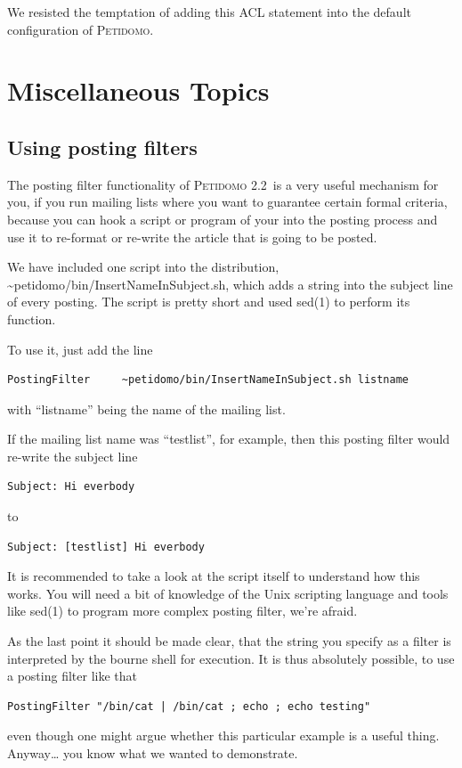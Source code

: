 \documentclass[a4paper,10pt]{scrreprt}
\newcommand{\Petidomo}{{\scshape Peti\-domo}}
\newcommand{\PetidomoTwo}{{\scshape Peti\-domo 2.2}}
\newcommand{\file}[1]{{\sf #1}}
\begin{document}
We resisted the temptation of adding this ACL statement into the
default configuration of \Petidomo.

%
\chapter{Miscellaneous Topics}
\section{Using posting filters}
\label{using posting filters}

The posting filter functionality of \PetidomoTwo\ is a very useful
mechanism for you, if you run mailing lists where you want to
guarantee certain formal criteria, because you can hook a script or
program of your into the posting process and use it to re-format or
re-write the article that is going to be posted.

We have included one
script into the distribution,
\file{\~{}peti\-domo/bin/Insert\-Name\-In\-Sub\-ject.sh}, which adds a string
into the subject line of every posting. The script is pretty short and
used sed(1) to perform its function.

To use it, just add the line
\begin{verbatim}
PostingFilter     ~petidomo/bin/InsertNameInSubject.sh listname
\end{verbatim}
with ``listname'' being the name of the mailing list.

If the mailing list name was ``testlist'', for example, then this
posting filter would re-write the subject line
\begin{verbatim}
Subject: Hi everbody
\end{verbatim}
to
\begin{verbatim}
Subject: [testlist] Hi everbody
\end{verbatim}

It is recommended to take a look at the script itself to understand
how this works. You will need a bit of knowledge of the Unix scripting
language and tools like sed(1) to program more complex posting filter,
we're afraid.

As the last point it should be made clear, that the string you specify
as a filter is interpreted by the bourne shell for execution. It is
thus absolutely possible, to use a posting filter like that
\begin{verbatim}
PostingFilter "/bin/cat | /bin/cat ; echo ; echo testing"
\end{verbatim}
even though one might argue whether this particular example is a
useful thing. Anyway\dots{} you know what we wanted to demonstrate.
\end{document}
